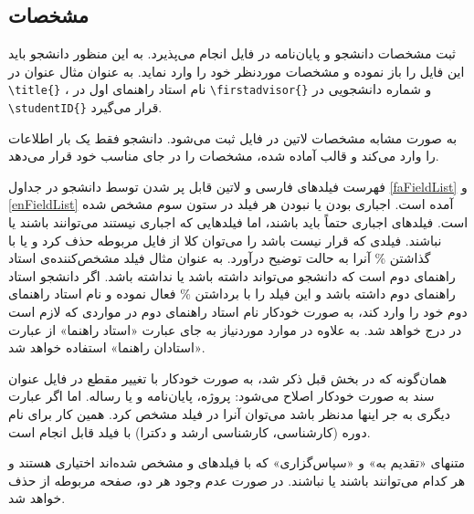 
\subsection{مشخصات \پ}\label{Sec:spec}
ثبت مشخصات دانشجو و پایان‌نامه در فایل 
انجام می‌پذیرد. به این منظور دانشجو باید این فایل را باز نموده و مشخصات موردنظر خود را وارد نماید.
به عنوان مثال عنوان \پ در 
\verb!\title{}!
، نام استاد راهنمای اول در 
\verb!\firstadvisor{}!
و شماره دانشجویی در 
\verb!\studentID{}!
قرار می‌گیرد.

به صورت مشابه مشخصات لاتین \پ در فایل 
ثبت می‌شود.
دانشجو فقط یک بار اطلاعات را وارد می‌کند و قالب آماده شده، مشخصات را در جای مناسب خود قرار می‌دهد.


فهرست فیلدهای فارسی و لاتین قابل پر شدن توسط دانشجو  در جداول
\ref{faFieldList} و \ref{enFieldList}
  آمده است.
اجباری بودن یا نبودن هر فیلد در ستون سوم مشخص شده است. فیلدهای اجباری حتماً باید باشند، اما فیلدهایی که اجباری نیستند می‌توانند باشند یا نباشند.
فیلدی که قرار نیست باشد را می‌توان کلا از فایل مربوطه حذف کرد و یا با گذاشتن 
\%
آنرا به حالت توضیح درآورد.
به عنوان مثال فیلد 
مشخص‌کننده‌ی استاد راهنمای دوم است که دانشجو می‌تواند داشته باشد یا نداشته باشد.
اگر دانشجو استاد راهنمای دوم داشته باشد و این فیلد را با برداشتن 
\%
فعال نموده و نام استاد راهنمای دوم خود را وارد کند، به صورت خودکار نام استاد راهنمای دوم در مواردی که لازم است در \پ درج خواهد شد. به علاوه در موارد موردنیاز به جای عبارت «استاد راهنما» از عبارت «استادان راهنما» استفاده خواهد شد.

همان‌گونه که در بخش قبل ذکر شد، به صورت خودکار با تغییر مقطع \پ در فایل
عنوان سند به صورت خودکار اصلاح می‌شود: پروژه، پایان‌نامه و یا رساله. اما اگر عبارت دیگری به جر اینها مدنظر باشد می‌توان آنرا در فیلد
مشخص کرد. همین کار برای نام دوره (کارشناسی، کارشناسی ارشد و دکترا) با فیلد
قابل انجام است.

متنهای «تقدیم به» و «سپاس‌گزاری» که با فیلدهای 
 و 
مشخص شده‌اند اختیاری هستند و هر کدام می‌توانند باشند یا نباشند.
در صورت عدم وجود هر دو، صفحه مربوطه از \پ حذف خواهد شد.

